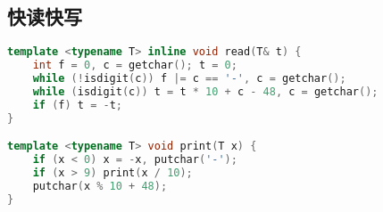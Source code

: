 \subsection{快读快写}
\begin{lstlisting}[language=c++]
template <typename T> inline void read(T& t) {
    int f = 0, c = getchar(); t = 0; 
    while (!isdigit(c)) f |= c == '-', c = getchar();
    while (isdigit(c)) t = t * 10 + c - 48, c = getchar();
    if (f) t = -t;
}

template <typename T> void print(T x) {
    if (x < 0) x = -x, putchar('-');
    if (x > 9) print(x / 10);
    putchar(x % 10 + 48);
} 

\end{lstlisting}